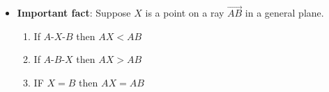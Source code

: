 \documentclass{report}
\begin{document}
\begin{itemize}
    \item \textbf{Important fact}:  Suppose $X$ is a point on a ray $\overrightarrow{AB}$ in a general plane.
        \begin{enumerate}
            \item If $ A\text{-}X\text{-}B$ then $AX < AB $
            \item If $ A\text{-}B\text{-}X$ then $AX > AB $
            \item IF $X = B$ then $AX = AB$
        \end{enumerate}









    \end{itemize}


    \pagebreak 
\end{document}
